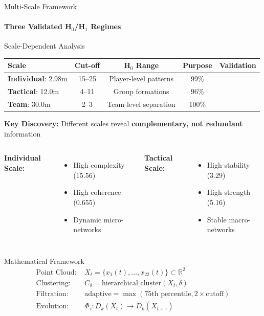 \documentclass[aspectratio=169]{beamer}
\newcommand{\highlight}[1]{\textcolor{accentorange}{\textbf{#1}}}
\newcommand{\scaleitem}[2]{\textbf{#1}: #2}
\begin{document}
\begin{frame}{Multi-Scale Framework}
\framesubtitle{Three Validated H$_0$/H$_1$ Regimes}

\begin{block}{Scale-Dependent Analysis}
\begin{table}
\centering
\small
\begin{tabular}{@{}lcccc@{}}
\toprule
\textbf{Scale} & \textbf{Cut-off} & \textbf{H$_0$ Range} & \textbf{Purpose} & \textbf{Validation} \\
\midrule
\scaleitem{Individual}{2.98m} & 15--25 & Player-level patterns & 99\% \\
\scaleitem{Tactical}{12.0m} & 4--11 & Group formations & 96\% \\
\scaleitem{Team}{30.0m} & 2--3 & Team-level separation & 100\% \\
\bottomrule
\end{tabular}
\end{table}
\end{block}

\vspace{0.3cm}
\textbf{Key Discovery:} Different scales reveal \highlight{complementary, not redundant} information

\begin{columns}[T]
\textbf{Individual Scale:}
\begin{itemize}
    \item High complexity (15.56)
    \item High coherence (0.655)
    \item Dynamic micro-networks
\end{itemize}

\textbf{Tactical Scale:}
\begin{itemize}
    \item High stability (3.29)
    \item High strength (5.16)
    \item Stable macro-networks
\end{itemize}
\end{columns}

\vspace{0.3cm}
\begin{block}{Mathematical Framework}
\begin{align*}
\text{Point Cloud: } & X_t = \{x_1(t),\ldots,x_{22}(t)\} \subset \mathbb{R}^2 \\
\text{Clustering: } & C_\delta = \text{hierarchical\_cluster}(X_t, \delta) \\
\text{Filtration: } & \text{adaptive} = \max(\text{75th percentile}, 2 \times \text{cutoff}) \\
\text{Evolution: } & \Phi_\tau: D_k(X_t) \to D_k(X_{t+\tau})
\end{align*}
\end{block}
\end{frame}
\end{document}
